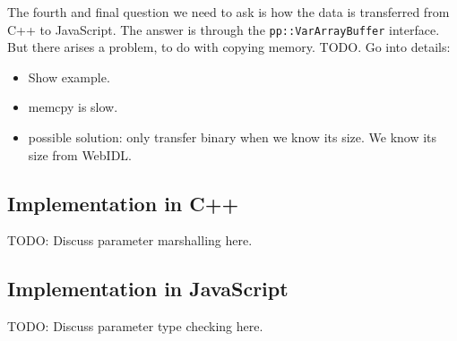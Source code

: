 The fourth and final question we need to ask is how the data is transferred from C++ to JavaScript. The answer is through the \lstinline{pp::VarArrayBuffer} interface. But there arises a problem, to do with copying memory. TODO. Go into details:
\begin{itemize}
	\item Show example.
	\item memcpy is slow.
	\item possible solution: only transfer binary when we know its size. We know its size from WebIDL.
\end{itemize}



\subsection{Implementation in C++} %
\label{sub:webidl_implementation_in_cpp_}
TODO: Discuss parameter marshalling here.

\subsection{Implementation in JavaScript} %
\label{sub:webidl_implementation_in_javascript}
TODO: Discuss parameter type checking here.

